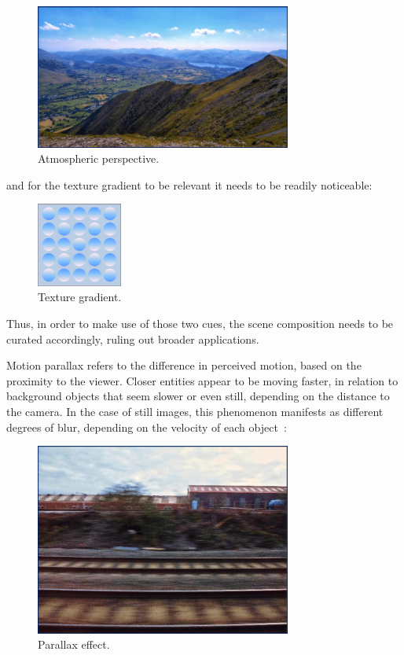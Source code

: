 \begin{figure}[H]
    \includegraphics[width=0.75\textwidth, height=0.25\textwidth]{resources/png/atmospheric_perspective.png}
    \caption{Atmospheric perspective.~\cite{withGeneralDepth}~\label{figAtmos}}
\end{figure}

and for the texture gradient to be relevant it needs to be readily noticeable:

\begin{figure}[H]
    \includegraphics[width=0.25\textwidth, height=0.25\textwidth]{resources/png/texture.png}
    \caption{Texture gradient.~\cite{withGeneralDepth}~\label{figTexture}}
\end{figure}

Thus, in order to make use of those two cues, the scene composition needs to be curated
accordingly, ruling out broader applications.

Motion parallax refers to the difference in perceived motion, based on the proximity 
to the viewer. Closer entities appear to be moving faster, in relation to background 
objects that seem slower or even still, depending on the distance to the camera. In 
the case of still images, this phenomenon manifests as different degrees of blur, 
depending on the velocity of each object~\cite{withGeneralDepth}:

\begin{figure}[H]
    \includegraphics[width=0.75\textwidth, height=0.25\textwidth]{resources/png/parallax.png}
    \caption{Parallax effect.~\cite{withGeneralDepth}~\label{figParallax}}
\end{figure}


